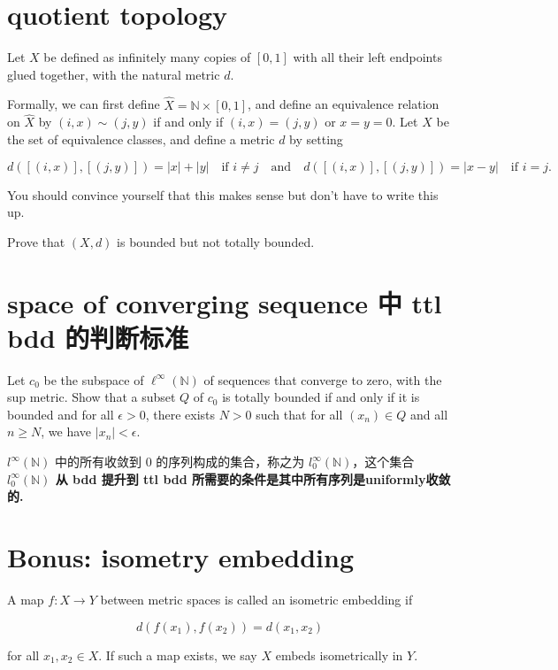 \documentclass[lang=cn,11pt]{template}
\begin{document}
\section{quotient topology}
Let \( X \) be defined as infinitely many copies of \( [0, 1] \) with all their left endpoints glued together, with the natural metric \( d \).

Formally, we can first define \( \hat{X} = \mathbb{N} \times [0, 1] \), and define an equivalence relation on \( \hat{X} \) by \( (i, x) \sim (j, y) \) if and only if \( (i, x) = (j, y) \) or \( x = y = 0 \). Let \( X \) be the set of equivalence classes, and define a metric \( d \) by setting

\[
d([ (i, x) ], [ (j, y) ]) = |x| + |y| \quad \text{if } i \neq j \quad \text{and} \quad d([ (i, x) ], [ (j, y) ]) = |x - y| \quad \text{if } i = j.
\]

You should convince yourself that this makes sense but don’t have to write this up.

Prove that \( (X, d) \) is bounded but not totally bounded.

\section{space of converging sequence 中 ttl bdd 的判断标准}
Let \( c_0 \) be the subspace of \( \ell^\infty(\mathbb{N}) \) of sequences that converge to zero, with the sup metric. Show that a subset \( Q \) of \( c_0 \) is totally bounded if and only if it is bounded and for all \( \epsilon > 0 \), there exists \( N > 0 \) such that for all \( (x_n) \in Q \) and all \( n \geq N \), we have \( |x_n| < \epsilon \).


\begin{remark}
$l^{\infty}(\mathbb{N})$ 中的所有收敛到 0 的序列构成的集合，称之为 $l_0^{\infty}(\mathbb{N})$，这个集合 \textbf{$l_0^{\infty}(\mathbb{N})$ 从 bdd 提升到 ttl bdd 所需要的条件是其中所有序列是uniformly收敛的.}
    
\end{remark}


\section{Bonus: isometry embedding}
A map \( f: X \to Y \) between metric spaces is called an isometric embedding if

\[
d(f(x_1), f(x_2)) = d(x_1, x_2)
\]

for all \( x_1, x_2 \in X \). If such a map exists, we say \( X \) embeds isometrically in \( Y \).
\end{document}
